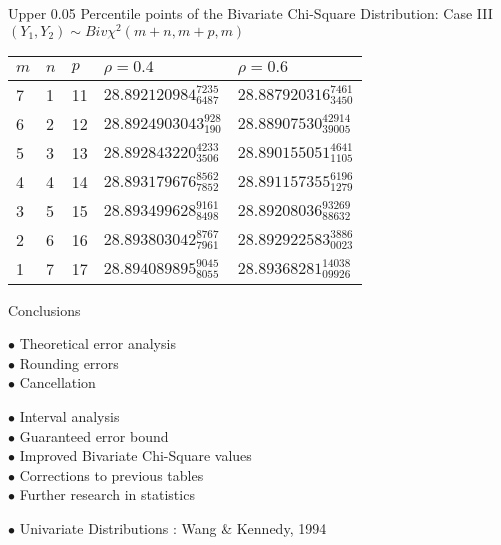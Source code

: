 \documentclass{slides}
\begin{document}
\begin{slide}
\renewcommand{\arraystretch}{1.5}

\begin{center}
Upper 0.05 Percentile points of the Bivariate Chi-Square Distribution:
Case III \\
$(Y_1, Y_2) \sim Biv\chi^2(m+n,m+p,m)$
\end{center}
\begin{center}
\begin{tabular}{l|l|l|l|l}
$m$ & $n$  & $p$ & $\rho=0.4$ & $\rho=0.6$ \\ \hline
7   & 1      & 11    & $28.892120984_{6487}^{7235} $ &
$28.887920316_{3450}^{7461} $ \\
6   & 2      & 12    & $28.8924903043_{190}^{928}  $ &
$28.88907530_{39005}^{42914} $ \\
5   & 3      & 13    & $28.892843220_{3506}^{4233} $ &
$28.890155051_{1105}^{4641} $ \\
4   & 4      & 14    & $28.893179676_{7852}^{8562} $ &
$28.891157355_{1279}^{6196} $ \\
3   & 5      & 15    & $28.893499628_{8498}^{9161} $ &
$28.89208036_{88632}^{93269} $ \\
2   & 6      & 16    & $28.893803042_{7961}^{8767} $ &
$28.892922583_{0023}^{3886} $ \\
1   & 7      & 17    & $28.894089895_{8055}^{9045} $ & $28.89368281_{09926}^{14038} $ \\
\end{tabular}
\end{center}

\end{slide}
\begin{slide}
Conclusions


$\bullet$ Theoretical error analysis \\
$\bullet$ Rounding errors \\
$\bullet$ Cancellation

$\bullet$ Interval analysis \\
$\bullet$ Guaranteed error bound \\
$\bullet$ Improved Bivariate Chi-Square values \\
$\bullet$ Corrections to previous tables \\

$\bullet$ Further research in statistics

$\bullet$ Univariate Distributions : Wang \& Kennedy, 1994

\end{slide}
\end{document}

